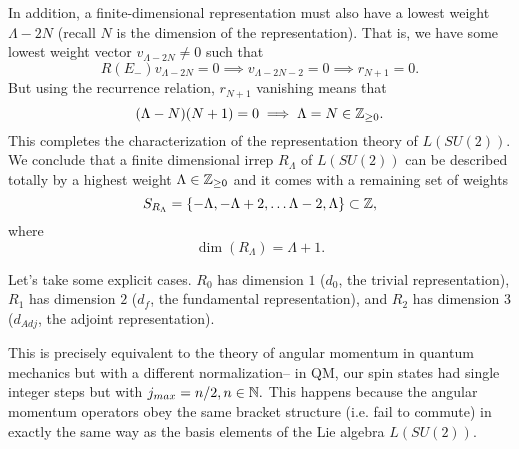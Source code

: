 In addition, a finite-dimensional representation must also have a lowest weight $\Lambda-2N$ (recall $N$ is the dimension of the representation). That is, we have some lowest weight vector $v_{\Lambda-2N}\neq 0$ such that
%
$$R(E_-)v_{\Lambda-2N}=0\implies v_{\Lambda-2N-2}=0 \implies r_{N+1}=0.$$
%
But using the recurrence relation, $r_{N+1}$ vanishing means that 
%
$$(\Lambda - N)(N+1)=0 \implies \Lambda= N \in \mathbb{Z}_{\geq 0}.$$
%
This completes the characterization of the representation theory of $L(SU(2))$. We conclude that a finite dimensional irrep $R_\Lambda$ of $L(SU(2))$ can be described totally by a highest weight $\Lambda \in \mathbb{Z}_{\geq 0}$ and it comes with a remaining set of weights
$$S_{R_\Lambda}=\{-\Lambda, -\Lambda+2,\ldots \Lambda-2,\Lambda\}\subset \mathbb{Z},$$
where $$\dim(R_\Lambda)=\Lambda+1.$$

\begin{exm}
Let's take some explicit cases. $R_0$ has dimension $1$ ($d_0$, the trivial representation), $R_1$ has dimension $2$ ($d_f$, the fundamental representation), and $R_2$ has dimension 3 ($d_{Adj}$, the adjoint representation).
\end{exm}

This is precisely equivalent to the theory of angular momentum in quantum mechanics but with a different normalization-- in QM, our spin states had single integer steps but with $j_{max}=n/2, n\in\mathbb{N}.$ This happens because the angular momentum operators obey the same bracket structure (i.e. fail to commute) in exactly the same way as the basis elements of the Lie algebra $L(SU(2))$. 